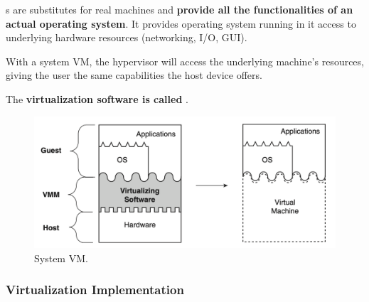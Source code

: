 s are substitutes for real machines and \textbf{provide all the functionalities of an actual operating system}. It provides operating system running in it access to underlying hardware resources (networking, I/O, GUI).

\highspace
With a system VM, the hypervisor will access the underlying machine's resources, giving the user the same capabilities the host device offers.

\highspace
The \textbf{virtualization software is called }.

\begin{figure}[!htp]
    \centering
    \includegraphics[width=.9\textwidth]{img/vm-3.png}
    \caption{System VM.}
\end{figure}

\newpage

\subsubsection{Virtualization Implementation}

